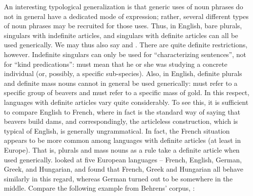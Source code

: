 An interesting typological generalization is that generic uses of noun phrases do not in general have a dedicated mode of expression; rather, several different types of noun phrases may be recruited for those uses. Thus, in English, bare plurals, singulars with indefinite articles, and singulars with definite articles can all be used generically. We may thus also say  and . There are quite definite restrictions, however. Indefinite singulars can only be used for “characterizing sentences”, not for “kind predications”: must mean that he or she was studying a concrete individual (or, possibly, a specific sub-species). Also, in English, definite plurals and definite mass nouns cannot in\textbf{ }general be used generically:  must refer to a specific group of beavers and  must refer to a specific mass of gold. In this respect, languages with definite articles vary quite considerably. To see this, it is sufficient to compare English to French, where in fact  is the standard way of saying that beavers build dams, and correspondingly, the articleless construction, which is typical of English, is generally ungrammatical. In fact, the French situation appears to be more common among languages with definite articles (at least in Europe). That is, plurals and mass nouns as a rule take a definite article when used generically. \citet{Behrens2005} looked at five European languages – French, English, German, Greek, and Hungarian, and found that French, Greek and Hungarian all behave similarly in this regard, whereas German turned out to be somewhere in the middle. Compare the following example from Behrens’ corpus, :


\ea
	\z 
\z


